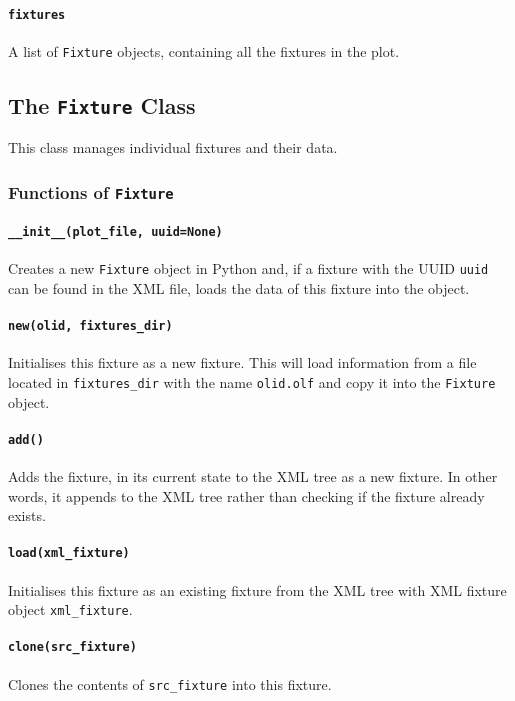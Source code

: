 \documentclass[a4paper]{article}
\begin{document}
\paragraph{\texttt{fixtures}}
A list of \texttt{Fixture} objects, containing all the fixtures in the plot.

\subsection{The \texttt{Fixture} Class}
This class manages individual fixtures and their data.

\subsubsection{Functions of \texttt{Fixture}}

\paragraph{\texttt{\_\_init\_\_(plot\_file, uuid=None)}}
Creates a new \texttt{Fixture} object in Python and, if a fixture with the 
UUID \texttt{uuid} can be found in the XML file, loads the data of this 
fixture into the object.

\paragraph{\texttt{new(olid, fixtures\_dir)}}
Initialises this fixture as a new fixture. This will load information from a 
file located in \texttt{fixtures\_dir} with the name \texttt{olid.olf} and 
copy it into the \texttt{Fixture} object.

\paragraph{\texttt{add()}}
Adds the fixture, in its current state to the XML tree as a new fixture. In 
other words, it appends to the XML tree rather than checking if the fixture 
already exists.

\paragraph{\texttt{load(xml\_fixture)}}
Initialises this fixture as an existing fixture from the XML tree with 
XML fixture object \texttt{xml\_fixture}.

\paragraph{\texttt{clone(src\_fixture)}}
Clones the contents of \texttt{src\_fixture} into this fixture.
\end{document}
